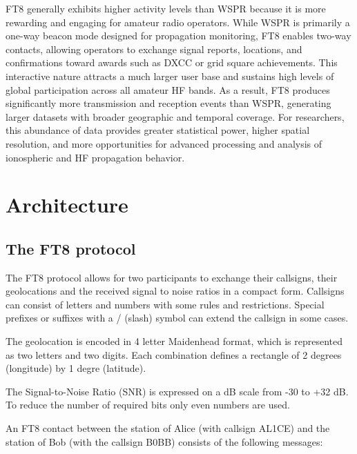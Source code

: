 \documentclass[signals,article,submit,pdftex,moreauthors]{Definitions/mdpi}
\begin{document}
FT8 generally exhibits higher activity levels than WSPR because it is more
rewarding and engaging for amateur radio operators. While WSPR is primarily a
one-way beacon mode designed for propagation monitoring, FT8 enables two-way
contacts, allowing operators to exchange signal reports, locations, and
confirmations toward awards such as DXCC or grid square achievements. This
interactive nature attracts a much larger user base and sustains high levels of
global participation across all amateur HF bands. As a result, FT8 produces
significantly more transmission and reception events than WSPR, generating
larger datasets with broader geographic and temporal coverage. For researchers,
this abundance of data provides greater statistical power, higher spatial
resolution, and more opportunities for advanced processing and analysis of
ionospheric and HF propagation behavior.

\section{Architecture}

\subsection{The FT8 protocol}


%

The FT8 protocol \cite{franke2020} allows for two participants to exchange their callsigns, their geolocations
and the received signal to noise ratios in a compact form. Callsigns can consist of letters
and numbers with some rules and restrictions. Special prefixes or suffixes with a / (slash)
symbol can extend the callsign in some cases.

The geolocation is encoded in 4 letter Maidenhead format, which is represented as two letters and
two digits. Each combination defines a rectangle of 2 degrees (longitude) by 1 degre (latitude).

The Signal-to-Noise Ratio (SNR) is expressed on a dB scale from -30 to +32 dB. To reduce
the number of required bits only even numbers are used.

An FT8 contact between the station of Alice (with callsign AL1CE) and the station
of Bob (with the callsign B0BB) consists of the following messages:
\end{document}

